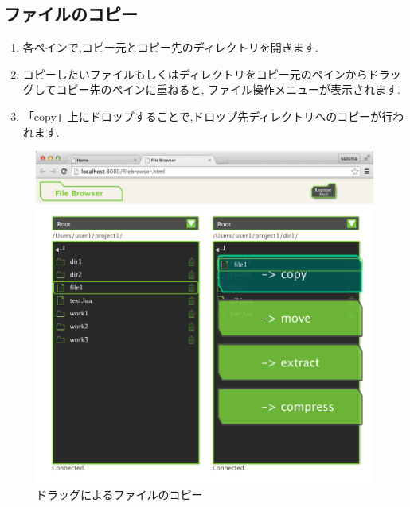 \documentclass[a4paper,10pt,oneside]{jsbook}
\begin{document}
\subsection{ファイルのコピー}
\begin{enumerate}
	\item 各ペインで,コピー元とコピー先のディレクトリを開きます.
	\item コピーしたいファイルもしくはディレクトリをコピー元のペインからドラッグしてコピー先のペインに重ねると,
		 ファイル操作メニューが表示されます.
	\item 「copy」上にドロップすることで,ドロップ先ディレクトリへのコピーが行われます.
\end{enumerate}
\begin{figure}[H]
	\begin{center}
		\includegraphics[width=12.0cm]{image/filebrowser_003.png}
	\end{center}
	\caption{ドラッグによるファイルのコピー}
	\label{fig:filebrowser_filecopy}
\end{figure}

\newpage
\end{document}
